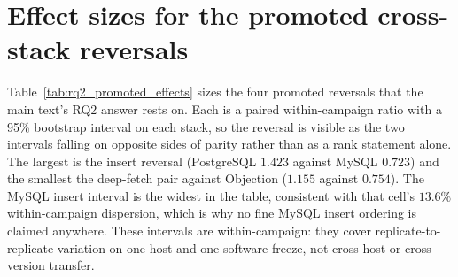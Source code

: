 \documentclass[11pt,a4paper]{article}
\newcommand{\tabledir}{tables/}
\begin{document}
\section{Effect sizes for the promoted cross-stack reversals}
\label{sup:rq2-effects}
Table~\ref{tab:rq2_promoted_effects} sizes the four promoted reversals that the main text's RQ2
answer rests on. Each is a paired within-campaign ratio with a 95\% bootstrap interval on each
stack, so the reversal is visible as the two intervals falling on opposite sides of parity rather
than as a rank statement alone. The largest is the insert reversal (PostgreSQL $1.423$ against
MySQL $0.723$) and the smallest the deep-fetch pair against Objection ($1.155$ against $0.754$).
The MySQL insert interval is the widest in the table, consistent with that cell's $13.6\%$
within-campaign dispersion, which is why no fine MySQL insert ordering is claimed anywhere.
These intervals are within-campaign: they cover replicate-to-replicate variation on one host and
one software freeze, not cross-host or cross-version transfer.


\end{document}
